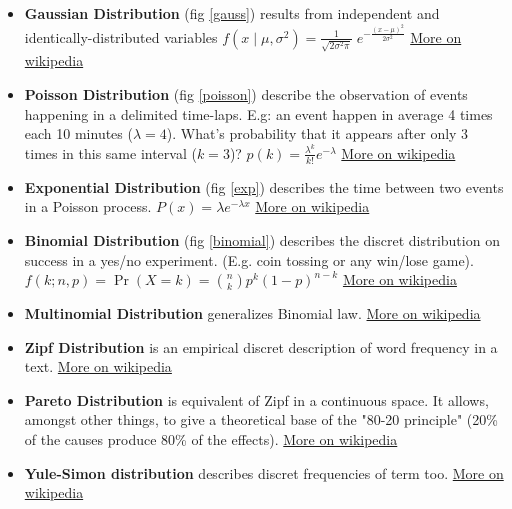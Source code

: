 \documentclass[a4paper,11pt,twoside]{article}
\begin{document}
\begin{itemize}
	\item \textbf{Gaussian Distribution} (fig \ref{gauss}) results from independent and identically-distributed variables 
	$f(x\;|\;\mu ,\sigma ^{2})={\frac {1}{\sqrt {2\sigma ^{2}\pi }}}\;e^{-{\frac {(x-\mu )^{2}}{2\sigma ^{2}}}}$
	\href{https://en.wikipedia.org/wiki/Gaussian_distribution}{More on wikipedia}
	
	\item \textbf{Poisson Distribution} (fig \ref{poisson}) describe the observation of events happening in a delimited time-laps. E.g: an event happen in average 4 times each 10 minutes ($\lambda = 4$). What's probability that it appears after only 3 times in this same interval ($k = 3$)? $p(k) = \frac{\lambda ^k}{k!}e^{-\lambda}$ \href{https://en.wikipedia.org/wiki/Poisson_distribution}{More on wikipedia}

	\item \textbf{Exponential Distribution} (fig \ref{exp}) describes the time between two events in a Poisson process. $P(x) = \lambda e^{- \lambda x}$ \href{https://en.wikipedia.org/wiki/Exponential_distribution}{More on wikipedia}
	
	\item \textbf{Binomial Distribution} (fig \ref{binomial}) describes the discret distribution on success in a yes/no experiment. (E.g. coin tossing or any win/lose game). $f(k;n,p)=\Pr(X=k)={\binom {n}{k}}p^{k}(1-p)^{n-k}$ \href{https://en.wikipedia.org/wiki/Binomial_distribution}{More on wikipedia}
	
	\item \textbf{Multinomial Distribution} generalizes Binomial law. \href{https://en.wikipedia.org/wiki/Multinomial_distribution}{More on wikipedia}
	
	\item \textbf{Zipf Distribution} is an empirical discret description of word frequency in a text. \href{https://en.wikipedia.org/wiki/Zipfs_law}{More on wikipedia}
	
	\item \textbf{Pareto Distribution} is equivalent of Zipf in a continuous space. It allows, amongst other things, to give a theoretical base of the "80-20 principle" (20\% of the causes produce 80\% of the effects). \href{https://en.wikipedia.org/wiki/Pareto_distribution}{More on wikipedia}
	
	\item \textbf{Yule-Simon distribution} describes discret frequencies of term too. \href{https://en.wikipedia.org/wiki/Yule?Simon_distribution}{More on wikipedia}
\end{itemize}
\end{document}
